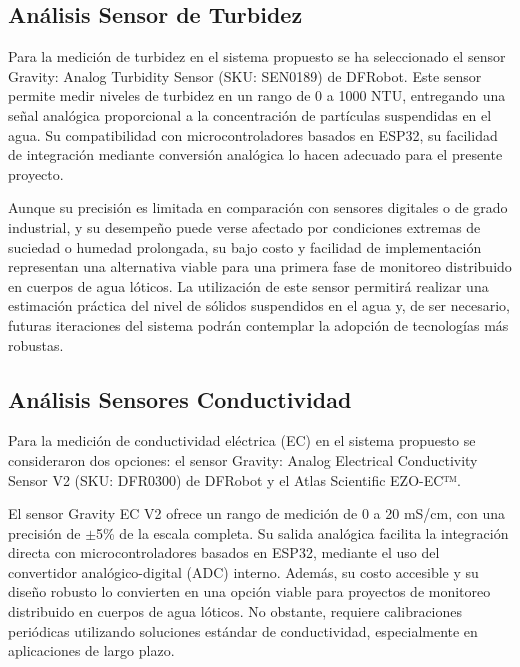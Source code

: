 \subsection{Análisis Sensor de Turbidez}
\label{subsec:analisis_sensor_de_turbidez}


Para la medición de turbidez en el sistema propuesto se ha seleccionado el sensor Gravity: Analog Turbidity Sensor (SKU: SEN0189) de DFRobot. Este sensor permite medir niveles de turbidez en un rango de 0 a 1000 NTU, entregando una señal analógica proporcional a la concentración de partículas suspendidas en el agua. Su compatibilidad con microcontroladores basados en ESP32, su facilidad de integración mediante conversión analógica lo hacen adecuado para el presente proyecto.

Aunque su precisión es limitada en comparación con sensores digitales o de grado industrial, y su desempeño puede verse afectado por condiciones extremas de suciedad o humedad prolongada, su bajo costo y facilidad de implementación representan una alternativa viable para una primera fase de monitoreo distribuido en cuerpos de agua lóticos. La utilización de este sensor permitirá realizar una estimación práctica del nivel de sólidos suspendidos en el agua y, de ser necesario, futuras iteraciones del sistema podrán contemplar la adopción de tecnologías más robustas.

\subsection{Análisis Sensores Conductividad}
\label{subsec:analisis_sensores_conductividad}


Para la medición de conductividad eléctrica (EC) en el sistema propuesto se consideraron dos opciones: el sensor Gravity: Analog Electrical Conductivity Sensor V2 (SKU: DFR0300) de DFRobot y el Atlas Scientific EZO-EC™.

El sensor Gravity EC V2 ofrece un rango de medición de 0 a 20 mS/cm, con una precisión de $\pm$5\% de la escala completa. Su salida analógica facilita la integración directa con microcontroladores basados en ESP32, mediante el uso del convertidor analógico-digital (ADC) interno. Además, su costo accesible y su diseño robusto lo convierten en una opción viable para proyectos de monitoreo distribuido en cuerpos de agua lóticos. No obstante, requiere calibraciones periódicas utilizando soluciones estándar de conductividad, especialmente en aplicaciones de largo plazo.

